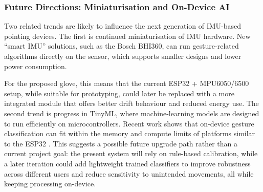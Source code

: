 \subsubsection{Future Directions: Miniaturisation and On-Device AI}

Two related trends are likely to influence the next generation of IMU-based pointing devices. The first is continued miniaturisation of IMU hardware. New “smart IMU” solutions, such as the Bosch BHI360, can run gesture-related algorithms directly on the sensor, which supports smaller designs and lower power consumption.

For the proposed glove, this means that the current ESP32 + MPU6050/6500 setup, while suitable for prototyping, could later be replaced with a more integrated module that offers better drift behaviour and reduced energy use. The second trend is progress in TinyML, where machine-learning models are designed to run efficiently on microcontrollers. Recent work shows that on-device gesture classification can fit within the memory and compute limits of platforms similar to the ESP32 \cite{arxiv_airmouse_future}. This suggests a possible future upgrade path rather than a current project goal: the present system will rely on rule-based calibration, while a later iteration could add lightweight trained classifiers to improve robustness across different users and reduce sensitivity to unintended movements, all while keeping processing on-device.
